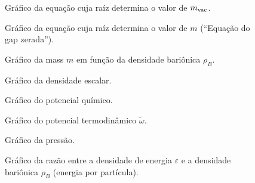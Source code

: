 \begin{figure}
	
	\caption{Gráfico da equação cuja raíz determina o valor de $m_{\rm{vac}}$. \protect}
	\label{Fig:vacuum_mass_equation_NJL-Buballa_Set_1}
\end{figure}

\begin{figure}
	
	\caption{Gráfico da equação cuja raíz determina o valor de $m$ (``Equação do gap zerada''). \protect}
	\label{Fig:gap_NJL-Buballa_Set_1}
\end{figure}

\begin{figure}
	
	\caption{Gráfico da mass $m$ em função da densidade bariônica $\rho_B$. \protect}
	\label{Fig:mass_NJL-Buballa_Set_1}
\end{figure}


\begin{figure}
	
	\caption{Gráfico da densidade escalar. \protect}
	\label{Fig:scalar_density_NJL-Buballa_Set_1}
\end{figure}

\begin{figure}
	
	\caption{Gráfico do potencial químico. \protect}
	\label{Fig:chemical_potential_NJL-Buballa_Set_1}
\end{figure}

\begin{figure}
	
	\caption{Gráfico do potencial termodinâmico $\tilde{\omega}$. \protect}
	\label{Fig:thermodynamic_potential_NJL-Buballa_Set_1}
\end{figure}

\begin{figure}
	
	\caption{Gráfico da pressão. \protect}
	\label{Fig:pressure_NJL-Buballa_Set_1}
\end{figure}

\begin{figure}
	
	\caption{Gráfico da razão entre a densidade de energia $\varepsilon$ e a densidade bariônica $\rho_B$ (energia por partícula). \protect}
	\label{Fig:energy_density_per_particle_NJL-Buballa_Set_1}
\end{figure}

